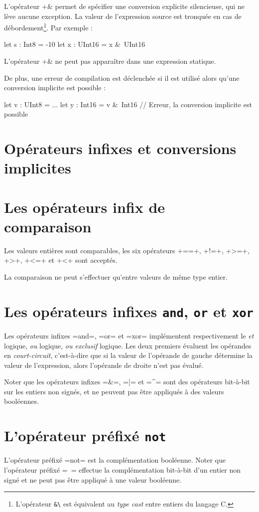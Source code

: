 L'opérateur \plm+&\+ permet de spécifier une conversion explicite silencieuse, qui ne lève aucune exception. La valeur de l'expression source est tronquée en cas de débordement\footnote{L'opérateur \texttt{\&\textbackslash} est équivalent au \emph{type cast} entre entiers du langage C.}. Par exemple :

\begin{PLM}
let s : Int8 = -10
let x : UInt16 = x &\ UInt16
\end{PLM}

L'opérateur \plm+&\+ ne peut pas apparaître dans une expression statique.

De plus, une erreur de compilation est déclenchée si il est utilisé alors qu'une conversion implicite est possible :
\begin{PLM}
let v : UInt8 = ...
let y : Int16 = v &\ Int16 // Erreur, la conversion implicite est possible
\end{PLM}

\section{Opérateurs infixes et conversions implicites}



\section{Les opérateurs infix de comparaison}

Les valeurs entières sont comparables, les six opérateurs \plm+==+, \plm+!=+, \plm+>=+, \plm+>+, \plm+<=+ et \plm+<+ sont acceptés.

La comparaison ne peut s'effectuer qu'entre valeurs de même type entier.









\section{Les opérateurs infixes \texttt{and}, \texttt{or} et \texttt{xor}}

Les opérateurs infixes \plm=and=, \plm=or= et \plm=xor= implémentent respectivement le \emph{et} logique, \emph{ou} logique, \emph{ou exclusif} logique. Les deux premiers évaluent les opérandes en \emph{court-circuit}, c'est-à-dire que si la valeur de l'opérande de gauche détermine la valeur de l'expression, alors l'opérande de droite n'est pas évalué.

Noter que les opérateurs infixes \plm=&=, \plm=|= et \plm=^= sont des opérateurs bit-à-bit sur les entiers non signés, et ne peuvent pas être appliqués à des valeurs booléennes.


\section{L'opérateur préfixé \texttt{not}}

L'opérateur préfixé \plm=not= est la complémentation booléenne. Noter que l'opérateur préfixé \plm=~= effectue la complémentation bit-à-bit d'un entier non signé et ne peut pas être appliqué à une valeur booléenne.

